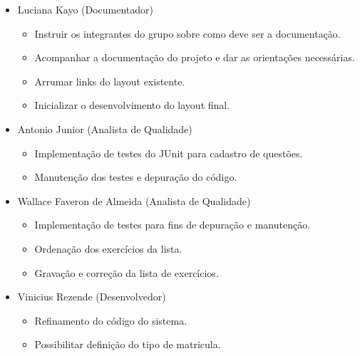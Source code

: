 \documentclass[12pt,letterpaper]{article}
\begin{document}
\begin{itemize}
\item {}Luciana Kayo (Documentador)\\
\vspace{-0.5cm}
\begin{itemize}
\item{}Instruir os integrantes do grupo sobre como deve ser a documentação.\\
\item{}Acompanhar a documentação do projeto e dar as orientações necessárias.\\
\item{}Arrumar links do layout existente.\\
\item{}Inicializar o desenvolvimento do layout final.
\end{itemize}
\vspace{0.5cm}

\item {}Antonio Junior (Analista de Qualidade)\\
\vspace{-0.5cm}
\begin{itemize}
\item{}Implementação de testes do JUnit para cadastro de questões.\\
\item{}Manutenção dos testes e depuração do código.
\end{itemize}
\vspace{0.5cm}

\item {}Wallace Faveron de Almeida (Analista de Qualidade)\\
\vspace{-0.5cm}
\begin{itemize}
\item{}Implementação de testes para fins de depuração e manutenção.\\
\item{}Ordenação dos exercícios da lista.\\
\item{}Gravação e correção da lista de exercícios.
\end{itemize}
\vspace{0.5cm}

\item {}Vinicius Rezende (Desenvolvedor)\\
\vspace{-0.5cm}
\begin{itemize}
\item{}Refinamento do código do sistema.\\
\item{}Possibilitar definição do tipo de matricula.
\end{itemize}
\vspace{0.5cm}


\end{itemize}
\end{document}

